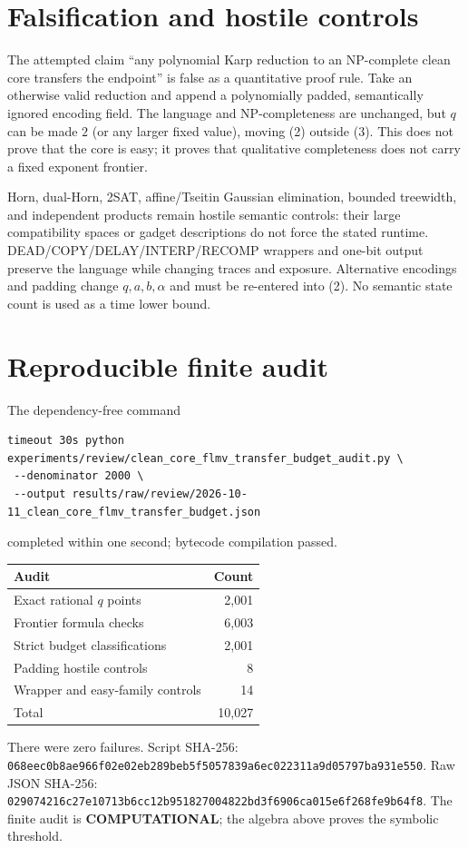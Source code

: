 \documentclass[11pt]{article}
\newcommand{\COMP}{\textbf{COMPUTATIONAL}}
\begin{document}
\section{Falsification and hostile controls}
The attempted claim ``any polynomial Karp reduction to an NP-complete clean
core transfers the endpoint'' is false as a quantitative proof rule.  Take
an otherwise valid reduction and append a polynomially padded, semantically
ignored encoding field.  The language and NP-completeness are unchanged,
but $q$ can be made $2$ (or any larger fixed value), moving (2) outside (3).
This does not prove that the core is easy; it proves that qualitative
completeness does not carry a fixed exponent frontier.

Horn, dual-Horn, 2SAT, affine/Tseitin Gaussian elimination, bounded
treewidth, and independent products remain hostile semantic controls: their
large compatibility spaces or gadget descriptions do not force the stated
runtime.  DEAD/COPY/DELAY/INTERP/RECOMP wrappers and one-bit output preserve
the language while changing traces and exposure.  Alternative encodings and
padding change $q,a,b,\alpha$ and must be re-entered into (2).  No semantic
state count is used as a time lower bound.

\section{Reproducible finite audit}
The dependency-free command
\begin{verbatim}
timeout 30s python experiments/review/clean_core_flmv_transfer_budget_audit.py \
 --denominator 2000 \
 --output results/raw/review/2026-10-11_clean_core_flmv_transfer_budget.json
\end{verbatim}
completed within one second; bytecode compilation passed.
\begin{center}
\begin{tabular}{lr}\toprule Audit & Count\\ \midrule
Exact rational $q$ points & 2,001\\
Frontier formula checks & 6,003\\
Strict budget classifications & 2,001\\
Padding hostile controls & 8\\
Wrapper and easy-family controls & 14\\ \midrule
Total & 10,027\\ \bottomrule
\end{tabular}
\end{center}
There were zero failures.  Script SHA-256:
\nolinkurl{068eec0b8ae966f02e02eb289beb5f5057839a6ec022311a9d05797ba931e550}.
Raw JSON SHA-256:
\nolinkurl{029074216c27e10713b6cc12b951827004822bd3f6906ca015e6f268fe9b64f8}.
The finite audit is \COMP; the algebra above proves the symbolic threshold.
\end{document}
